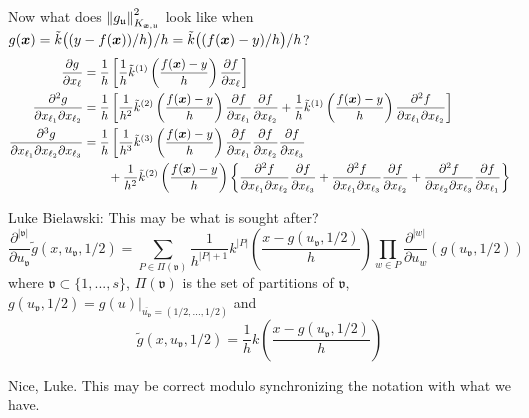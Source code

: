 \documentclass[letterpaper]{amsart}
\newcommand{\KXu}{K_{\vx,\fu}}
\newcommand{\tk}{\tilde{k}}
\newcommand{\FJHNote}[1]{{\color{blue} #1}}
\begin{document}
Now what does $\norm[\KXu]{g_\fu}^2$ look like when $g(\vx) = \tk\bigl((y-f(\vx))/h\bigr)/h = \tk\bigl((f(\vx) - y)/h\bigr)/h$?
\begin{align*}
	\frac{\partial g}{\partial x_\ell} &= \frac 1{h} \left[ \frac 1h \tk^{(1)}\left(\frac{f(\vx) - y}{h} \right) \frac{\partial f}{\partial x_\ell} \right] \\
	\frac{\partial^2 g}{\partial x_{\ell_1} \partial x_{\ell_2}}
	&= \frac 1{h} \left[\frac 1{h^2} \tk^{(2)}\left(\frac{f(\vx) - y}{h} \right)  \frac{\partial f}{\partial x_{\ell_1}}  \frac{\partial f}{\partial x_{\ell_2}} + \frac 1h \tk^{(1)}\left(\frac{f(\vx) - y}{h} \right)  \frac{\partial^2 f}{\partial x_{\ell_1}\partial x_{\ell_2}} \right] \\
	\frac{\partial^3 g}{\partial x_{\ell_1} \partial x_{\ell_2} \partial x_{\ell_3}}
 &= \frac 1{h} \left[\frac 1{h^3} \tk^{(3)}\left(\frac{f(\vx) - y}{h} \right)  \frac{\partial f}{\partial x_{\ell_1}}  
 \frac{\partial f}{\partial x_{\ell_2}} \frac{\partial f}{\partial x_{\ell_3}} \right.\\
 & \qquad + \frac 1{h^2} \tk^{(2)}\left(\frac{f(\vx) - y}{h} \right)
 \left \{ \frac{\partial^2 f}{\partial x_{\ell_1}\partial x_{\ell_2}} \frac{\partial f}{\partial x_{\ell_3}}
 + \frac{\partial^2 f}{\partial x_{\ell_1}\partial x_{\ell_3}} \frac{\partial f}{\partial x_{\ell_2}}
 + \frac{\partial^2 f}{\partial x_{\ell_2}\partial x_{\ell_3}} \frac{\partial f}{\partial x_{\ell_1}}
 \right\} \\
\end{align*}

Luke Bielawski: This may be what is sought after?
\[
 \frac{\partial^{|\mathfrak{v}|}}{\partial u_\mathfrak{v}} \tilde{g}(x, u_\mathfrak{v}, 1/2) =  \sum_{P \in \Pi(\mathfrak{v})} \frac{1}{h^{|P|+1}} k^{|P|}\left(\frac{x - g(u_\mathfrak{v}, 1/2)}{h}\right) \prod_{w \in P} \frac{\partial^{|w|}}{\partial u_w}(g(u_\mathfrak{v}, 1/2))
\]
where $\mathfrak{v}\subset \{1, ..., s\}$, $\Pi(\mathfrak{v})$ is the set of partitions of $\mathfrak{v}$, $g(u_\mathfrak{v}, 1/2) = g(u)|_{\overline{u_\mathfrak{v}} = (1/2, ..., 1/2)}$ and
\[
\tilde{g}(x, u_\mathfrak{v}, 1/2) = \frac{1}{h}k\left( \frac{x - g(u_\mathfrak{v}, 1/2)}{h}\right)
\]

\FJHNote{Nice, Luke.  This may be correct modulo synchronizing the notation with what we have.}
\end{document}
